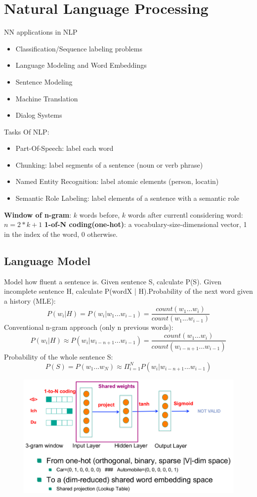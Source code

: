 \section{Natural Language Processing}
\label{sect:natural-language-processing}
NN applications in NLP
\begin{itemize}
	\item Classification/Sequence labeling problems
	\item Language Modeling and Word Embeddings
	\item Sentence Modeling
	\item Machine Translation
	\item Dialog Systems
\end{itemize}
Tasks Of NLP:
\begin{itemize}
	\item Part-Of-Speech: label each word
	\item Chunking: label segments of a sentence (noun or verb phrase)
	\item Named Entity Recognition: label atomic elements (person, locatin)
	\item Semantic Role Labeling: label elements of a sentence with a semantic role 
\end{itemize}
\textbf{Window of n-gram}: $k$ words before, $k$ words after currentl 
considering word: $n= 2*k + 1$
\textbf{1-of-N coding(one-hot)}: a vocabulary-size-dimensional vector, 1 in the index of the word, 0 otherwise.

\subsection{Language Model}
\label{ssect:language-model}
Model how fluent a sentence is. Given sentence S, calculate P(S). Given incomplete sentence H, calculate P(wordX | H).Probability of the next word given a history (MLE):
\[
P(w_i|H) = P(w_i | w_1 ... w_{i-1}) = \frac{count(w_1 ... w_i)}{count(w_1 ... w_{i-1})}
\]
Conventional n-gram approach (only n previous words):
\[
P(w_i|H) \approx P(w_i | w_{i-n+1} ... w_{i-1}) = \frac{count(w_1 ... w_i)}{count(w_{i-n+1} ... w_{i-1})}
\]
Probability of the whole sentence S:
\[
P(S) = P(w_1 ... w_N) \approx \Pi_{i=1}^N P(w_i | w_{i-n+1} ... w_{i-1})
\]
\begin{figure}[h]
\includegraphics[scale=0.4]{word-embeddings}
\end{figure}
